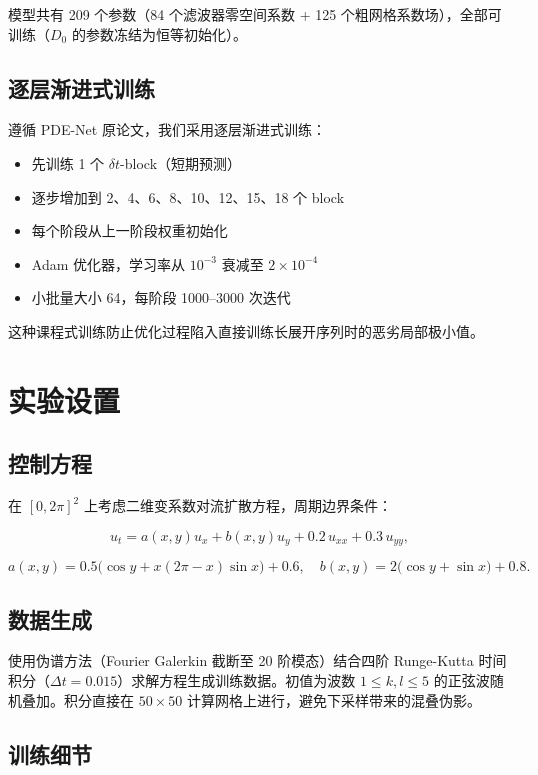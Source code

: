 \documentclass[11pt,a4paper]{article}
\begin{document}
模型共有 209 个参数（84 个滤波器零空间系数 + 125 个粗网格系数场），全部可训练（$D_0$ 的参数冻结为恒等初始化）。

\subsection{逐层渐进式训练}

遵循 PDE-Net 原论文，我们采用逐层渐进式训练：

\begin{itemize}
    \item 先训练 1 个 $\delta t$-block（短期预测）
    \item 逐步增加到 2、4、6、8、10、12、15、18 个 block
    \item 每个阶段从上一阶段权重初始化
    \item Adam 优化器，学习率从 $10^{-3}$ 衰减至 $2\times10^{-4}$
    \item 小批量大小 64，每阶段 1000--3000 次迭代
\end{itemize}

这种课程式训练防止优化过程陷入直接训练长展开序列时的恶劣局部极小值。

\section{实验设置}

\subsection{控制方程}

在 $[0,2\pi]^2$ 上考虑二维变系数对流扩散方程，周期边界条件：

\[
u_t = a(x,y) u_x + b(x,y) u_y + 0.2\, u_{xx} + 0.3\, u_{yy},
\]

\[
a(x,y) = 0.5\bigl(\cos y + x(2\pi-x)\sin x\bigr) + 0.6,\quad
b(x,y) = 2\bigl(\cos y + \sin x\bigr) + 0.8.
\]

\subsection{数据生成}

使用伪谱方法（Fourier Galerkin 截断至 20 阶模态）结合四阶 Runge-Kutta 时间积分（$\Delta t = 0.015$）求解方程生成训练数据。初值为波数 $1 \leq k,l \leq 5$ 的正弦波随机叠加。积分直接在 $50\times50$ 计算网格上进行，避免下采样带来的混叠伪影。

\subsection{训练细节}
\end{document}
